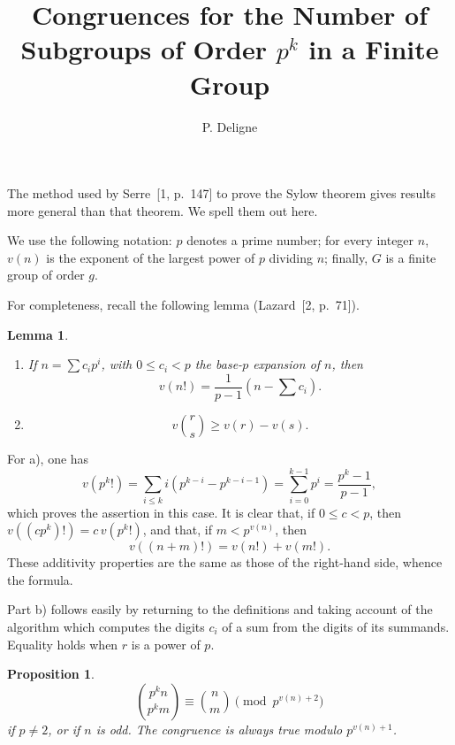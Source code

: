 \documentclass[12pt]{amsart}
\title{Congruences for the Number of Subgroups of Order $p^k$ in a Finite Group}
\author{P. Deligne}
\date{}
\theoremstyle{plain}
\newtheorem{lemma}{Lemma}
\newtheorem{proposition}{Proposition}
\begin{document}
\maketitle
\thispagestyle{empty}

The method used by Serre~[1, p.~147] to prove the Sylow theorem gives results more general than that theorem. We spell them out here.

We use the following notation: $p$ denotes a prime number; for every integer $n$, $v(n)$ is the exponent of the largest power of $p$ dividing $n$; finally, $G$ is a finite group of order $g$.

For completeness, recall the following lemma (Lazard~[2, p.~71]).

\begin{lemma}\ \par
\begin{enumerate}
\item[a)] If $n = \sum c_i p^i$, with $0 \leq c_i < p$ the base-$p$ expansion of $n$, then
\[
v(n!) = \frac{1}{p-1}\left(n - \sum c_i\right).
\]
\item[b)]
\[
v\binom{r}{s} \geq v(r)-v(s).
\]
\end{enumerate}
\end{lemma}

For a), one has
\[
v(p^k!)=\sum_{i\leq k} i(p^{k-i}-p^{k-i-1})=\sum_{i=0}^{k-1}p^i=\frac{p^k-1}{p-1},
\]
which proves the assertion in this case. It is clear that, if $0\leq c<p$, then $v((cp^k)!)=c\,v(p^k!)$, and that, if $m<p^{v(n)}$, then
\[
v((n+m)!)=v(n!)+v(m!).
\]
These additivity properties are the same as those of the right-hand side, whence the formula.

Part b) follows easily by returning to the definitions and taking account of the algorithm which computes the digits $c_i$ of a sum from the digits of its summands. Equality holds when $r$ is a power of $p$.

\begin{proposition}
\[
\binom{p^k n}{p^k m}\equiv \binom{n}{m}\pmod {p^{v(n)+2}}
\]
if $p\neq 2$, or if $n$ is odd. The congruence is always true modulo $p^{v(n)+1}$.
\end{proposition}
\end{document}

